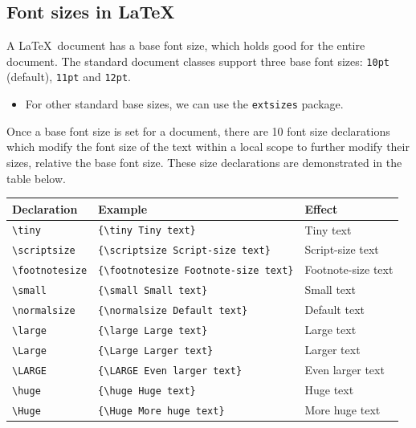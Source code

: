 	\subsection{Font sizes in \LaTeX}
		A \LaTeX\ document has a base font size, which holds good for the entire document. The standard document classes support three base font sizes: \verb|10pt| (default), \verb|11pt| and \verb|12pt|.\vspace{-2.5ex}
		\begin{itemize}
			\item For other standard base sizes, we can use the \verb|extsizes| package.
		\end{itemize}
		
		Once a base font size is set for a document, there are 10 font size declarations which modify the font size of the text within a local scope to further modify their sizes, relative the base font size. These size declarations are demonstrated in the table below.
		\begin{table}[h!]
			\centering
			\renewcommand{\arraystretch}{2.0}
			\begin{tabular}{lll}
				\toprule[1.5pt]
				\textbf{Declaration} & \textbf{Example} & \textbf{Effect} \\
				\midrule
				{\lstinline|\tiny|} & {\lstinline|{\tiny Tiny text}|} & {\tiny Tiny text} \\
				{\lstinline|\scriptsize|} & {\lstinline|{\scriptsize Script-size text}|} & {\scriptsize Script-size text} \\
				{\lstinline|\footnotesize|} & {\lstinline|{\footnotesize Footnote-size text}|} & {\footnotesize Footnote-size text} \\
				{\lstinline|\small|} & {\lstinline|{\small Small text}|} & {\small Small text} \\
				{\lstinline|\normalsize|} & {\lstinline|{\normalsize Default text}|} & {\normalsize Default text} \\
				{\lstinline|\large|} & {\lstinline|{\large Large text}|} & {\large Large text} \\
				{\lstinline|\Large|} & {\lstinline|{\Large Larger text}|} & {\Large Larger text} \\
				{\lstinline|\LARGE|} & {\lstinline|{\LARGE Even larger text}|} & {\LARGE Even larger text} \\
				{\lstinline|\huge|} & {\lstinline|{\huge Huge text}|} & {\huge Huge text} \\
				{\lstinline|\Huge|} & {\lstinline|{\Huge More huge text}|} & {\Huge More huge text} \\
				\bottomrule[1.5pt]
			\end{tabular}
		\end{table}
		
